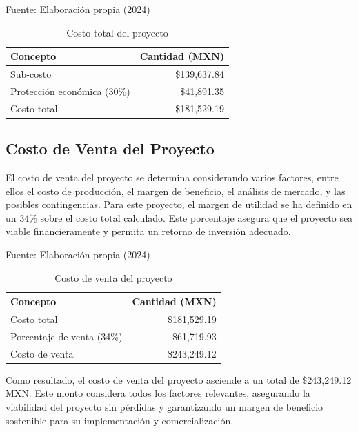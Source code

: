   \begin{table}[H]
  	\caption{Costo total del proyecto}
  	{Fuente: Elaboración propia (2024)}\\
  	\centering
  	\label{tabla:costo-total}
  	\begin{tabular}{lr}
\toprule
  		 {Concepto}             &  {Cantidad (MXN)} \\ \midrule
  		Sub-costo                     & \$139,637.84            \\  
  		Protección económica (30\%)   & \$41,891.35             \\  
  		 {Costo total}          &  {\$181,529.19}   \\ \bottomrule
  	\end{tabular}
  \end{table}
  
  \subsection{Costo de Venta del Proyecto}
  El costo de venta del proyecto se determina considerando varios factores, entre ellos el costo de producción, el margen de beneficio, el análisis de mercado, y las posibles contingencias. Para este proyecto, el margen de utilidad se ha definido en un 34\% sobre el costo total calculado. Este porcentaje asegura que el proyecto sea viable financieramente y permita un retorno de inversión adecuado.
  
  \begin{table}[H]
  	\caption{Costo de venta del proyecto}
  	{Fuente: Elaboración propia (2024)}\\
  	\centering
  	\label{tabla:costo-venta}
  	\begin{tabular}{lr}
  		\toprule
  		{Concepto}             & {Cantidad (MXN)} \\ \midrule
  		Costo total                   & \$181,529.19            \\  
  		Porcentaje de venta (34\%)    & \$61,719.93             \\  
  		 {Costo de venta}       &  {\$243,249.12}   \\  \bottomrule
  	\end{tabular}
  	
  \end{table}
  
  Como resultado, el costo de venta del proyecto asciende a un total de \$243,249.12 MXN. Este monto considera todos los factores relevantes, asegurando la viabilidad del proyecto sin pérdidas y garantizando un margen de beneficio sostenible para su implementación y comercialización.
  
